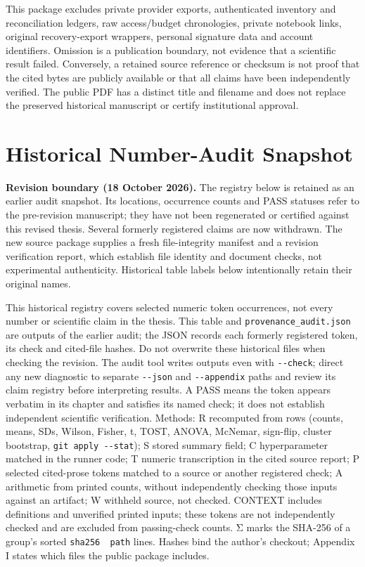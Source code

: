 \documentclass[12pt,a4paper]{report}
\begin{document}
This package excludes private provider exports, authenticated inventory
and reconciliation ledgers, raw access/budget chronologies, private
notebook links, original recovery-export wrappers, personal signature
data and account identifiers. Omission is a publication boundary, not
evidence that a scientific result failed. Conversely, a retained source
reference or checksum is not proof that the cited bytes are publicly
available or that all claims have been independently verified. The
public PDF has a distinct title and filename and does not replace the
preserved historical manuscript or certify institutional approval.



\chapter{Historical Number-Audit
Snapshot}\label{historical-number-audit-snapshot}

\textbf{Revision boundary (18 October 2026).} The registry below is
retained as an earlier audit snapshot. Its locations, occurrence counts
and PASS statuses refer to the pre-revision manuscript; they have not
been regenerated or certified against this revised thesis. Several
formerly registered claims are now withdrawn. The new source package
supplies a fresh file-integrity manifest and a revision verification
report, which establish file identity and document checks, not
experimental authenticity. Historical table labels below intentionally
retain their original names.

This historical registry covers selected numeric token occurrences, not
every number or scientific claim in the thesis. This table and
\texttt{provenance\_audit.json} are outputs of the earlier audit; the
JSON records each formerly registered token, its check and cited-file
hashes. Do not overwrite these historical files when checking the
revision. The audit tool writes outputs even with \texttt{-\/-check};
direct any new diagnostic to separate \texttt{-\/-json} and
\texttt{-\/-appendix} paths and review its claim registry before
interpreting results. A PASS means the token appears verbatim in its
chapter and satisfies its named check; it does not establish independent
scientific verification. Methods: R recomputed from rows (counts, means,
SDs, Wilson, Fisher, t, TOST, ANOVA, McNemar, sign-flip, cluster
bootstrap, \texttt{git\ apply\ -\/-stat}); S stored summary field; C
hyperparameter matched in the runner code; T numeric transcription in
the cited source report; P selected cited-prose tokens matched to a
source or another registered check; A arithmetic from printed counts,
without independently checking those inputs against an artifact; W
withheld source, not checked. CONTEXT includes definitions and
unverified printed inputs; these tokens are not independently checked
and are excluded from passing-check counts. Σ marks the SHA-256 of a
group's sorted \texttt{sha256\ \ path} lines. Hashes bind the author's
checkout; Appendix I states which files the public package includes.
\end{document}
